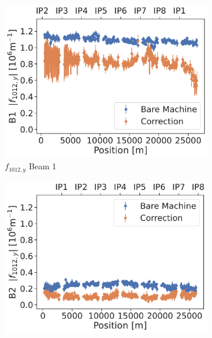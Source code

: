 \subsection{}


\begin{figure}[!htb]
    \centering
    \begin{subfigure}{0.49\textwidth}
        \includegraphics[width=\textwidth]{./images/f1012_b1.pdf}
        \caption{$f_{1012,y}$ Beam 1}
    \end{subfigure}
    \hfill
    \begin{subfigure}{0.49\textwidth}
        \includegraphics[width=\textwidth]{./images/f1012_b2.pdf}

\end{subfigure}
\end{figure}
